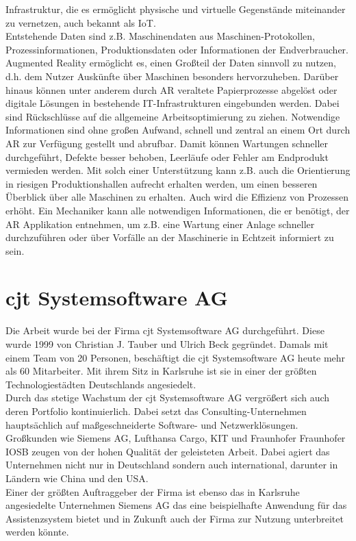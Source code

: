 Infrastruktur, die es ermöglicht physische und virtuelle Gegenstände miteinander zu vernetzen, auch bekannt als \ac{IoT}.
\\ 
Entstehende Daten sind z.B. Maschinendaten aus Maschinen-Protokollen, Prozessinformationen, Produktionsdaten oder 
Informationen der Endverbraucher. \cite{industrie40.2019f} Augmented Reality ermöglicht es, einen Großteil der Daten sinnvoll zu nutzen, d.h. 
dem Nutzer Auskünfte über Maschinen besonders hervorzuheben. Darüber hinaus können unter anderem durch \acs{AR} veraltete Papierprozesse 
abgelöst oder digitale Lösungen in bestehende IT-Infrastrukturen eingebunden werden. \cite{industrie40ar.2019n} 
Dabei sind Rückschlüsse auf die allgemeine Arbeitsoptimierung zu ziehen. Notwendige Informationen sind ohne 
großen Aufwand, schnell und zentral an einem Ort durch \acs{AR} zur Verfügung gestellt und abrufbar. Damit können 
Wartungen schneller durchgeführt, Defekte besser behoben, Leerläufe oder Fehler am Endprodukt vermieden werden. Mit solch einer Unterstützung 
kann z.B. auch die Orientierung in riesigen Produktionshallen aufrecht erhalten werden, um einen besseren Überblick über alle Maschinen 
zu erhalten. Auch wird die Effizienz von Prozessen erhöht. Ein Mechaniker kann alle notwendigen Informationen, die er benötigt, der 
\acl{AR} Applikation entnehmen, um z.B. eine Wartung einer Anlage schneller durchzuführen oder über Vorfälle an der Maschinerie in Echtzeit 
informiert zu sein. 
\pagebreak
\section{cjt Systemsoftware AG}
\label{chap:cjt}
Die Arbeit wurde bei der Firma cjt Systemsoftware AG durchgeführt. Diese wurde
1999 von Christian J. Tauber und Ulrich Beck gegründet. Damals mit einem Team
von 20 Personen, beschäftigt die cjt Systemsoftware AG heute mehr als 60 Mitarbeiter. 
Mit ihrem Sitz in Karlsruhe ist sie in einer der größten Technologiestädten Deutschlands angesiedelt.
\\
\linebreak
Durch das stetige Wachstum der cjt Systemsoftware AG vergrößert sich auch deren
Portfolio kontinuierlich. Dabei setzt das Consulting-Unternehmen hauptsächlich auf maßgeschneiderte
Software- und Netzwerklösungen. Großkunden wie Siemens AG, Lufthansa Cargo,
\ac{KIT} und Fraunhofer \acs{Fraunhofer IOSB} zeugen von der hohen Qualität der geleisteten Arbeit. 
Dabei agiert das Unternehmen nicht nur in Deutschland sondern auch international, darunter in Ländern wie China und den USA.
\\ 
\linebreak
Einer der größten Auftraggeber der Firma ist ebenso das in Karlsruhe angesiedelte Unternehmen Siemens AG das eine beispielhafte 
Anwendung für das Assistenzsystem bietet und in Zukunft auch der Firma zur Nutzung unterbreitet werden könnte. 
\pagebreak

